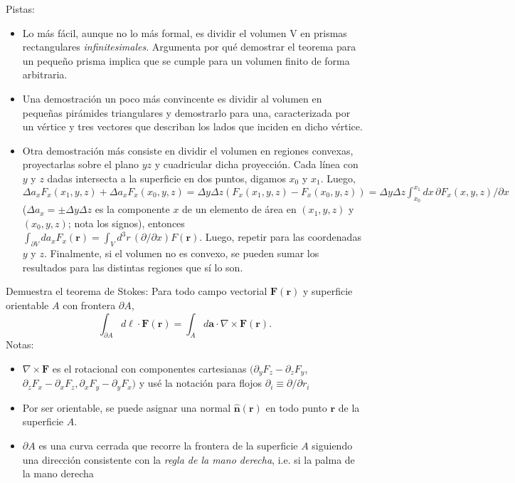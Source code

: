 \documentclass{exam}
\begin{document}
\begin{questions}
  Pistas:
  \begin{itemize}
  \item Lo más fácil, aunque no lo más formal, es dividir el volumen
    V en prismas rectangulares {\em infinitesimales}. Argumenta por qué
    demostrar el teorema para un pequeño prisma implica que se cumple
    para un volumen finito de forma arbitraria.
  \item   Una demostración un poco más convincente es dividir al volumen en
    pequeñas pirámides triangulares y demostrarlo para una, caracterizada
    por un vértice y tres vectores que describan los lados que inciden
    en dicho vértice.
  \item   Otra demostración más consiste en dividir el volumen en regiones
    convexas, proyectarlas sobre el plano $yz$ y cuadricular dicha
    proyección. Cada línea con $y$ y $z$ dadas intersecta a la
    superficie en dos puntos, digamos $x_0$ y $x_1$. Luego, $\Delta a_x
    F_x(x_1,y,z)+\Delta a_x F_x(x_0,y,z)=\Delta y\Delta
    z(F_x(x_1,y,z)-F_x(x_0,y,z))=\Delta y\Delta z\int_{x_0}^{x_1} dx\,
    \partial F_x(x,y,z)/\partial x$ ($\Delta a_x=\pm\Delta y
    \Delta z$ es la componente $x$ de un elemento de área en $(x_1,y,z)$ y
    $(x_0,y,z)$; nota los signos), entonces $\int_{\partial
      V} da_x F_x(\bm r)=\int_V d^3r\, (\partial/\partial x)F(\bm
    r)$. Luego, repetir para las coordenadas $y$ y $z$. Finalmente, si
    el volumen no es convexo, se pueden sumar los resultados para las
    distintas regiones que sí lo son.
  \end{itemize}
  \question Demuestra el teorema de Stokes: Para todo campo vectorial
  $\bm F(\bm r)$ y superficie orientable $A$ con frontera $\partial
  A$,
  $$
  \int_{\partial A}d\bm \ell\cdot\bm F(\bm r)=\int_A d\bm
  a\cdot\nabla\times\bm F(\bm r).
  $$
  Notas:
  \begin{itemize}
  \item $\nabla\times \bm F$ es el rotacional con componentes cartesianas
    $(\partial_yF_z-\partial_zF_y$, $\partial_z F_x-\partial_x F_z,
    \partial_x F_y-\partial_y F_x)$ y usé la notación para flojos
    $\partial_i\equiv\partial/\partial r_i$
  \item Por ser orientable, se puede asignar una normal $\hat
    {\bm n}(\bm r)$ en todo punto $\bm r$ de la superficie $A$.
  \item $\partial A$ es una curva cerrada que recorre la frontera de
    la superficie $A$ siguiendo una dirección consistente con la {\em
      regla de la mano derecha}, i.e. si la palma de la mano derecha

\end{itemize}
\end{questions}
\end{document}
